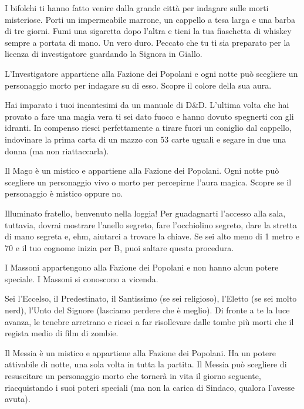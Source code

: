 {{{{{{{{{{{{{{{%
I bifolchi ti hanno fatto venire dalla grande città per indagare sulle morti misteriose. Porti un impermeabile marrone, un cappello a tesa larga e una barba di tre giorni. Fumi una sigaretta dopo l'altra e tieni la tua fiaschetta di whiskey sempre a portata di mano. Un vero duro. Peccato che tu ti sia preparato per la licenza di investigatore guardando la Signora in Giallo.

L'Investigatore appartiene alla Fazione dei Popolani e ogni notte può scegliere un personaggio morto per indagare su di esso. Scopre il colore della sua aura.
{%


{%
Hai imparato i tuoi incantesimi da un manuale di D\&D. L'ultima volta che hai provato a fare una magia vera ti sei dato fuoco e hanno dovuto spegnerti con gli idranti. In compenso riesci perfettamente a tirare fuori un coniglio dal cappello, indovinare la prima carta di un mazzo con 53 carte uguali e segare in due una donna (ma non riattaccarla).

Il Mago è un mistico e appartiene alla Fazione dei Popolani. Ogni notte può scegliere un personaggio vivo o morto per percepirne l'aura magica. Scopre se il personaggio è mistico oppure no.
{%


{%
Illuminato fratello, benvenuto nella loggia! Per guadagnarti l'accesso alla sala, tuttavia, dovrai mostrare l'anello segreto, fare l'occhiolino segreto, dare la stretta di mano segreta e, ehm, aiutarci a trovare la chiave. Se sei alto meno di 1 metro e 70 e il tuo cognome inizia per B, puoi saltare questa procedura.

I Massoni appartengono alla Fazione dei Popolani e non hanno alcun potere speciale. I Massoni si conoscono a vicenda.
{%


{%
Sei l'Eccelso, il Predestinato, il Santissimo (se sei religioso), l'Eletto (se sei molto nerd), l'Unto del Signore (lasciamo perdere che è meglio). Di fronte a te la luce avanza, le tenebre arretrano e riesci a far risollevare dalle tombe più morti che il regista medio di film di zombie.

Il Messia è un mistico e appartiene alla Fazione dei Popolani. Ha un potere attivabile di notte, una sola volta in tutta la partita. Il Messia può scegliere di resuscitare un personaggio morto che tornerà in vita il giorno seguente, riacquistando i suoi poteri speciali (ma non la carica di Sindaco, qualora l'avesse avuta).
{%


}}}}}}}}}}}}}}}}}}}}}}
